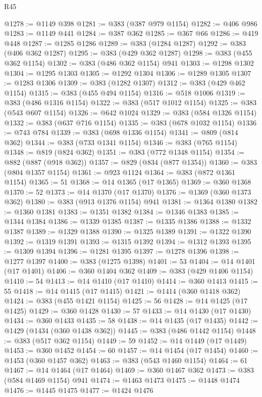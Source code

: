 \begin{lexlean}{R45}
\begin{coremodule}
@1278 := @1149 @398
@1281 := @383 (@387 @979 @1154)
@1282 := @406 @986
@1283 := @1149 @441
@1284 := @387 @362
@1285 := @367 @66
@1286 := @419 @448
@1287 := @1285 @1286
@1289 := @383 (@1284 @1287)
@1292 := @383 (@406 @362 @1287)
@1295 := @383 (@429 @362 @1287)
@1298 := @383 (@455 @362 @1154)
@1302 := @383 (@486 @362 @1154) @941
@1303 := @1298 @1302
@1304 := @1295 @1303
@1305 := @1292 @1304
@1306 := @1289 @1305
@1307 := @1283 @1306
@1309 := @383 (@1282 @1307)
@1312 := @383 (@429 @462 @1154)
@1315 := @383 (@455 @494 @1154)
@1316 := @518 @1006
@1319 := @383 (@486 @1316 @1154)
@1322 := @383 (@517 @1012 @1154)
@1325 := @383 (@543 @607 @1154)
@1326 := @642 @1024
@1329 := @383 (@584 @1326 @1154)
@1332 := @383 (@637 @716 @1154)
@1335 := @383 (@678 @1032 @1154)
@1336 := @743 @784
@1339 := @383 (@698 @1336 @1154)
@1341 := @809 (@814 @362)
@1344 := @383 (@733 @1341 @1154)
@1346 := @383 (@765 @1154)
@1348 := @819 (@824 @362)
@1351 := @383 (@772 @1348 @1154)
@1354 := @882 (@887 (@918 @362))
@1357 := @829 (@834 (@877 @1354))
@1360 := @383 (@804 @1357 @1154)
@1361 := @923 @1124
@1364 := @383 (@872 @1361 @1154)
@1365 := 51
@1368 := @14 @1365 (@17 @1365)
@1369 := @360 @1368
@1370 := 52
@1373 := @14 @1370 (@17 @1370)
@1376 := @1369 (@360 @1373 @362)
@1380 := @383 (@913 @1376 @1154) @941
@1381 := @1364 @1380
@1382 := @1360 @1381
@1383 := @1351 @1382
@1384 := @1346 @1383
@1385 := @1344 @1384
@1386 := @1339 @1385
@1387 := @1335 @1386
@1388 := @1332 @1387
@1389 := @1329 @1388
@1390 := @1325 @1389
@1391 := @1322 @1390
@1392 := @1319 @1391
@1393 := @1315 @1392
@1394 := @1312 @1393
@1395 := @1309 @1394
@1396 := @1281 @1395
@1397 := @1278 @1396
@1398 := @1277 @1397
@1400 := @383 (@1275 @1398)
@1401 := 53
@1404 := @14 @1401 (@17 @1401)
@1406 := @360 @1404 @362
@1409 := @383 (@429 @1406 @1154)
@1410 := 54
@1413 := @14 @1410 (@17 @1410)
@1414 := @360 @1413
@1415 := 55
@1418 := @14 @1415 (@17 @1415)
@1421 := @1414 (@360 @1418 @362)
@1424 := @383 (@455 @1421 @1154)
@1425 := 56
@1428 := @14 @1425 (@17 @1425)
@1429 := @360 @1428
@1430 := 57
@1433 := @14 @1430 (@17 @1430)
@1434 := @360 @1433
@1435 := 58
@1438 := @14 @1435 (@17 @1435)
@1442 := @1429 (@1434 (@360 @1438 @362))
@1445 := @383 (@486 @1442 @1154)
@1448 := @383 (@517 @362 @1154)
@1449 := 59
@1452 := @14 @1449 (@17 @1449)
@1453 := @360 @1452
@1454 := 60
@1457 := @14 @1454 (@17 @1454)
@1460 := @1453 (@360 @1457 @362)
@1463 := @383 (@543 @1460 @1154)
@1464 := 61
@1467 := @14 @1464 (@17 @1464)
@1469 := @360 @1467 @362
@1473 := @383 (@584 @1469 @1154) @941
@1474 := @1463 @1473
@1475 := @1448 @1474
@1476 := @1445 @1475
@1477 := @1424 @1476

\end{coremodule}
\end{lexlean}
